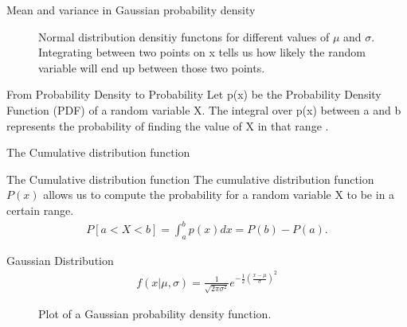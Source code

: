 \documentclass[notes]{beamer}
\begin{document}
    \begin{frame}{Mean and variance in Gaussian probability density}
      \begin{figure}
        
        \caption{Normal distribution densitiy functons for different values
                 of $\mu$ and $\sigma$. Integrating between two points on
                 x tells us how likely the random variable will end up between those 
                 two points.}
      \end{figure}
    \end{frame}

    \begin{frame}{From Probability Density to Probability}
      Let p(x) be the
      Probability Density Function
      (PDF) of a random variable
      X. The integral over p(x)
      between a and b represents
      the probability of finding the
      value of X in that range \cite{haslwanter2016introduction}.
    \end{frame}



    \begin{frame}{The Cumulative distribution function}
      \begin{figure}
        
      \end{figure}
    \end{frame}

    \begin{frame}{The Cumulative distribution function}
      The cumulative distribution function $P(x)$ allows us to compute
      the probability for a random variable X to be in a certain range.
      \begin{align}
        P[a < X < b] = \int_a^b p(x) dx = P(b) - P(a).
      \end{align}
      

    \end{frame}

    \begin{frame}{Gaussian Distribution}
      \begin{align}
        f(x|\mu, \sigma) = \frac{1}{\sqrt{2 \pi \sigma^2}}e^{-\frac{1}{2}(\frac{x - \mu}{\sigma})^2}
      \end{align}
      \begin{figure}
      
      \caption{Plot of a Gaussian probability density function.}
      \end{figure}
    \end{frame}
\end{document}
